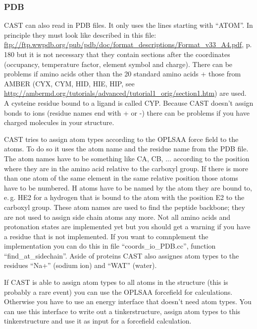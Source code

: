 \documentclass[10pt,a4paper]{article} %
\begin{document}
\subsubsection{PDB}  \label{sec:pdb}

CAST can also read in PDB files. It only uses the lines starting with ``ATOM''. In principle they must look like described in this file: \url{ftp://ftp.wwpdb.org/pub/pdb/doc/format_descriptions/Format_v33_A4.pdf}, p. 180 but it is not necessary that they contain sections after the coordinates (occupancy, temperature factor, element symbol and charge). There can be problems if amino acids other than the 20 standard amino acids + those from AMBER (CYX, CYM, HID, HIE, HIP, see \url{http://ambermd.org/tutorials/advanced/tutorial1_orig/section1.htm}) are used. A cysteine residue bound to a ligand is called CYP. Because CAST doesn't assign bonds to ions (residue names end with + or -) there can be problems if you have charged molecules in your structure. 

CAST tries to assign atom types according to the OPLSAA force field to the atoms. To do so it uses the atom name and the residue name from the PDB file. The atom names have to be something like CA, CB, ... according to the position where they are in the amino acid relative to the carboxyl group. If there is more than one atom of the same element in the same relative position those atoms have to be numbered. H atoms have to be named by the atom they are bound to, e.\,g. HE2 for a hydrogen that is bound to the atom with the position E2 to the carboxyl group. These atom names are used to find the peptide backbone; they are not used to assign side chain atoms any more. Not all amino acids and protonation states are implemented yet but you should get a warning if you have a residue that is not implemented. If you want to comnplement the implementation you can do this in file ``coords\_io\_PDB.cc'', function ``find\_at\_sidechain''. Aside of proteins CAST also assignes atom types to the residues ``Na+'' (sodium ion) and ``WAT'' (water).

If CAST is able to assign atom types to all atoms in the structure (this is probably a rare event) you can use the OPLSAA forcefield for calculations. Otherwise you have to use an energy interface that doesn't need atom types. You can use this interface to write out a tinkerstructure, assign atom types to this tinkerstructure and use it as input for a forcefield calculation. 


\end{document}
